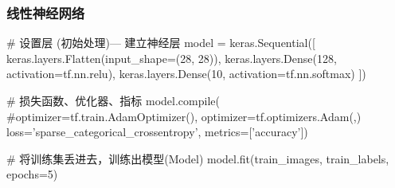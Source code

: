 \documentclass[12pt]{article}
\begin{document}
\subsubsection{线性神经网络}
\begin{python}
# 设置层  (初始处理)--- 建立神经层
model = keras.Sequential([
    keras.layers.Flatten(input_shape=(28, 28)),
    keras.layers.Dense(128, activation=tf.nn.relu),
    keras.layers.Dense(10, activation=tf.nn.softmax)
])

# 损失函数、优化器、指标
model.compile(
		#optimizer=tf.train.AdamOptimizer(),
		optimizer=tf.optimizers.Adam(,)
              loss='sparse_categorical_crossentropy',
              metrics=['accuracy'])

# 将训练集丢进去，训练出模型(Model)
model.fit(train_images, train_labels, epochs=5)
\end{python}



\end{document}
